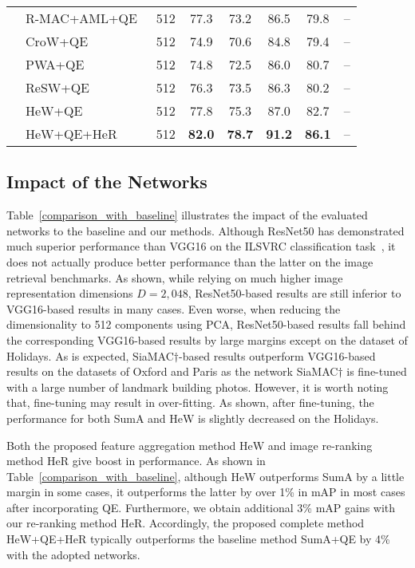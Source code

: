 \documentclass[journal]{IEEEtran}
\begin{document}
\begin{table*}[t]
\begin{center}
\begin{tabular}{|c|l|r|c c c c c|}
  \cline{2-8}
  &R-MAC+AML+QE~\cite{tolias2016particular}&512   &77.3 &73.2   &86.5     &79.8 &-- \\
  &CroW+QE~\cite{kalantidis2016cross}     &512   &74.9      &70.6        &84.8     &79.4       &--\\
  &PWA+QE~\cite{xu2018unsupervised}       &512   &74.8      &72.5        &86.0     &80.7      &--       \\
  &ReSW+QE~\cite{pang2018building}        &512   &76.3      &73.5        &86.3     &80.2      &--   \\
  &HeW+QE                                 &512   &77.8      &75.3        &87.0     &82.7      &-- \\
  &HeW+QE+HeR                             &512   &\textbf{82.0}   &\textbf{78.7}    &\textbf{91.2}           &\textbf{86.1}   &--\\
  \hline
\end{tabular}
\end{center}
\end{table*}

\subsection{Impact of the Networks}
Table~\ref{comparison_with_baseline}  illustrates the impact of the evaluated networks to the baseline and our methods.
Although ResNet50 has demonstrated much superior performance than VGG16 on the ILSVRC classification task~\cite{he2016deep,vedaldi2015matconvnet}, it does not actually produce better performance than the latter on the image retrieval benchmarks. As shown, while relying on much higher image representation dimensions $D=2,048$, ResNet50-based results are still inferior to VGG16-based results in many cases.
Even worse, when reducing the dimensionality to 512 components using PCA, ResNet50-based results fall behind the corresponding VGG16-based results by large margins except on the dataset of Holidays.
As is expected, SiaMAC$\dagger$-based results outperform VGG16-based results on the datasets of Oxford and Paris as the network SiaMAC$\dagger$ is fine-tuned with a large number of landmark building photos.
However, it is worth noting that, fine-tuning may result in over-fitting.
As shown, after fine-tuning, the performance for both SumA and HeW is slightly decreased on the Holidays.

Both the proposed feature aggregation method HeW and image re-ranking method HeR give boost in performance.
As shown in Table~\ref{comparison_with_baseline}, although HeW outperforms SumA by a little margin in some cases, it outperforms the latter by over 1\% in mAP in most cases after incorporating QE. Furthermore, we obtain additional 3\% mAP gains with our re-ranking method HeR. Accordingly, the proposed complete method HeW+QE+HeR typically outperforms the baseline method SumA+QE by 4\% with the adopted networks.
\end{document}
